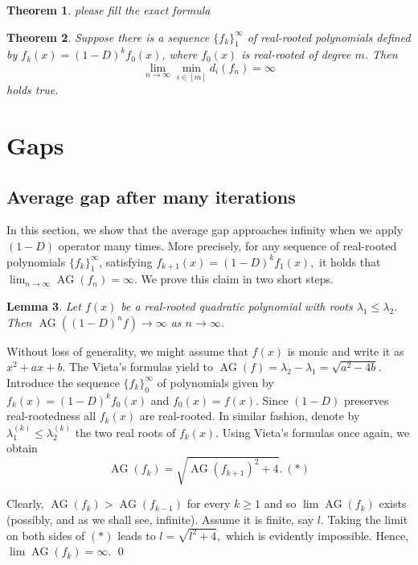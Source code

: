 \documentclass[11pt]{article}
\DeclareMathOperator{\AG}{AG}
\newtheorem{theorem}{Theorem}[section]
\newtheorem{lemma}[theorem]{Lemma}
\begin{document}
\begin{theorem}
please fill the exact formula
\end{theorem}

\begin{theorem}
Suppose there is a sequence $\{f_k\}_1^\infty$ of real-rooted polynomials defined by $f_k(x) = (1-D)^k f_0(x)$, where $f_0(x)$ is real-rooted of degree $m$. Then
\[\lim_{n\to\infty} \min_{i \in [m]} d_i (f_n) = \infty\]
holds true.
\end{theorem}
\section{Gaps}

\subsection{Average gap after many iterations}
 In this section, we show that the average gap approaches infinity when we apply $(1-D)$ operator many times. More precisely, for any sequence of real-rooted polynomials $\{f_k\}_1^{\infty}$, satisfying $f_{k+1}(x) = (1-D)^k f_{1}(x),$ it holds that $\lim_{n\to \infty} \AG(f_n) = \infty$. We prove this claim in two short steps.

 \begin{lemma}
 \label{degree two avg distance}
 Let $f(x)$ be a real-rooted quadratic polynomial with roots $\lambda_1 \leq \lambda_2$. Then $\AG((1-D)^n f) \to \infty$ as ${n\to \infty}$.
 \end{lemma}
\proof
Without loss of generality, we might assume that $f(x)$ is monic and write it as $x^2+ax+b$. The Vieta's formulas yield to $\AG(f) = \lambda_2 - \lambda_1 = \sqrt{a^2 - 4b}$. Introduce the sequence $\{f_k\}_{0}^\infty$ of polynomials given by $f_{k} (x)= (1-D)^k f_0(x)$ and $f_0(x) = f(x)$. Since $(1-D)$ preserves real-rootedness all $f_k(x)$ are real-rooted. In similar fashion, denote by $\lambda_1^{(k)} \leq \lambda_2^{(k)}$ the two real roots of $f_k(x)$. Using Vieta's formulas once again, we obtain
 \[\AG(f_k) = \sqrt{\AG(f_{k+1})^2 + 4}.~(*)\]

 Clearly, $\AG(f_k) > \AG(f_{k-1})$ for every $k\ge 1$ and so  $\lim \AG(f_k)$ exists (possibly, and as we shall see, infinite). Assume it is finite, say $l$. Taking the limit on both sides of $(*)$ leads to $l = \sqrt{l^2 + 4},$ which is evidently impossible. Hence, $\lim \AG(f_k) = \infty$. \qed
\end{document}
